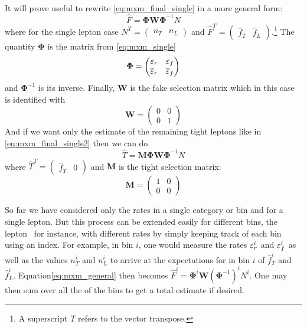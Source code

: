 It will prove useful to rewrite \eqn\eqref{eq:mxm_final_single}
in a more general form:
\begin{equation}
\label{eq:mxm_general}
\hat{F} = \mathbf{\Phi}\mathbf{W}\mathbf{\Phi}^{-1} N
\end{equation}
where for the single lepton case
$N^T=\begin{pmatrix} n_T & n_L\end{pmatrix}$ 
and 
$\hat{F}^T=\begin{pmatrix} \hat{f}_T & \hat{f}_L\end{pmatrix}$.\footnote{A 
superscript $T$ refers to the vector transpose.}
The quantity $\mathbf{\Phi}$ is the matrix from \eqn\eqref{eq:mxm_single}
\begin{equation}
\mathbf{\Phi} = 
  \begin{pmatrix}
  \varepsilon_r& \varepsilon_f\\ \overline{\varepsilon}_r& \overline{\varepsilon}_f
  \end{pmatrix} 
\end{equation}
and $\mathbf{\Phi}^{-1}$ is its inverse. Finally, $\mathbf{W}$
is the fake selection matrix which in this case is identified with
\begin{equation}
\mathbf{W}=\begin{pmatrix} 0 & 0 \\ 0 & 1 \end{pmatrix}
\end{equation}
And if we want only the estimate of the remaining tight leptons
like in \eqn\eqref{eq:mxm_final_single2}
then we can do 
\begin{equation}
\label{eq:mxm_general_tight}
\hat{T} = \mathbf{M}\mathbf{\Phi}\mathbf{W}\mathbf{\Phi}^{-1} N
\end{equation}
where $\hat{T}^T=\begin{pmatrix} \hat{f}_T & 0 \end{pmatrix}$
and $\mathbf{M}$ is the tight selection matrix:
\begin{equation}
\mathbf{M}=\begin{pmatrix} 1 & 0 \\ 0 & 0 \end{pmatrix}
\end{equation}




So far we have considered only the rates
in a single category or bin and for a single lepton. 
But this process can be extended easily for different bins, 
the lepton \pt~for instance, with different rates 
by simply keeping track of each bin using an index. For example,
in bin $i$, one would measure the rates $\varepsilon_r^i$ and $\varepsilon_f^i$
as well as the values $n_T^i$ and $n_L^i$ to arrive at the expectations
for in bin $i$ of $\hat{f}^i_T$ and $\hat{f}^i_L$.
Equation\eqref{eq:mxm_general} then becomes 
$\hat{F}^i = \mathbf{\Phi}^i\mathbf{W}(\mathbf{\Phi}^{-1})^i N^i$.
One may then sum over all the of the bins to get a total estimate
if desired.

